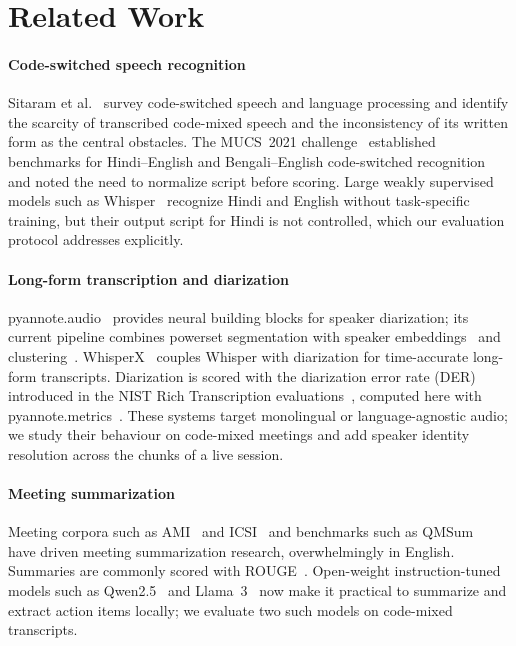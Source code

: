 \section{Related Work}
\label{sec:related}

\paragraph{Code-switched speech recognition}
Sitaram et al.~\cite{sitaram2019survey} survey code-switched speech and language
processing and identify the scarcity of transcribed code-mixed speech and the
inconsistency of its written form as the central obstacles. The MUCS~2021
challenge~\cite{diwan2021mucs} established benchmarks for Hindi--English and
Bengali--English code-switched recognition and noted the need to normalize
script before scoring. Large weakly supervised models such as
Whisper~\cite{radford2023whisper} recognize Hindi and English without
task-specific training, but their output script for Hindi is not controlled,
which our evaluation protocol addresses explicitly.

\paragraph{Long-form transcription and diarization}
pyannote.audio~\cite{bredin2020pyannote} provides neural building blocks for
speaker diarization; its current pipeline combines powerset segmentation
\cite{plaquet2023powerset} with speaker embeddings~\cite{wang2023wespeaker} and
clustering~\cite{bredin2023pyannote21}. WhisperX~\cite{bain2023whisperx} couples
Whisper with diarization for time-accurate long-form transcripts. Diarization is
scored with the diarization error rate (DER) introduced in the NIST Rich
Transcription evaluations~\cite{fiscus2006rt}, computed here with
pyannote.metrics~\cite{bredin2017pyannotemetrics}. These systems target
monolingual or language-agnostic audio; we study their behaviour on code-mixed
meetings and add speaker identity resolution across the chunks of a live
session.

\paragraph{Meeting summarization}
Meeting corpora such as AMI~\cite{carletta2005ami} and ICSI~\cite{janin2003icsi}
and benchmarks such as QMSum~\cite{zhong2021qmsum} have driven meeting
summarization research, overwhelmingly in English. Summaries are commonly scored
with ROUGE~\cite{lin2004rouge}. Open-weight instruction-tuned models such as
Qwen2.5~\cite{qwen2024qwen25} and Llama~3~\cite{grattafiori2024llama3} now make
it practical to summarize and extract action items locally; we evaluate two such
models on code-mixed transcripts.

